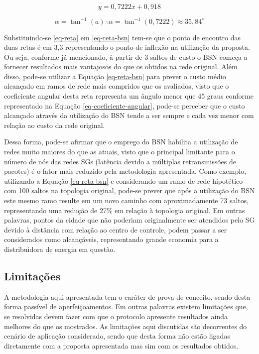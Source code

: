 \begin{equation}
y = 0,7222x + 0,918
\label{eq-reta-bsn}
\end{equation}

\begin{equation}
\alpha = \tan ^{-1}(a)\therefore \alpha =\tan ^{-1}(0,7222)\approx 35,84^{\circ}
\label{eq-coeficiente-angular}
\end{equation}

Substituindo-se \ref{eq-reta} em \ref{eq-reta-bsn} tem-se que o ponto de encontro das duas retas é em 3,3 representando o ponto de inflexão na utilização da proposta. Ou seja, conforme já mencionado, à partir de 3 saltos de custo o BSN começa a fornecer resultados mais vantajosos do que os obtidos na rede original. Além disso, pode-se utilizar a Equação \ref{eq-reta-bsn} para prever o custo médio alcançado em ramos de rede mais compridos que os avaliados, visto que o coeficiente angular desta reta representa um ângulo menor que 45 graus conforme representado na Equação \ref{eq-coeficiente-angular}, pode-se perceber que o custo alcançado através da utilização do BSN tende a ser sempre e cada vez menor com relação ao custo da rede original. 

Dessa forma, pode-se afirmar que o emprego do BSN habilita a utilização de redes muito maiores do que as atuais, visto que o principal limitante para o número de nós das redes SGs (latência devido a múltiplas retransmissões de pacotes) é o fator mais reduzido pela metodologia apresentada. Como exemplo, utilizando a Equação \ref{eq-reta-bsn} e considerando um ramo de rede hipotético com 100 saltos na topologia original, pode-se prever que após a utilização do BSN este mesmo ramo resulte em um novo caminho com aproximadamente 73 saltos, representando uma redução de 27\% em relação à topologia original. Em outras palavras, pontos da cidade que não poderiam originalmente ser atendidos pelo SG devido à distância com relação ao centro de controle, podem passar a ser considerados como alcançáveis, representando grande economia para a distribuidora de energia em questão.

\subsection{Limitações}
A metodologia aqui apresentada tem o caráter de prova de conceito, sendo desta forma passível de aperfeiçoamentos. Em outras palavras existem limitações que, se resolvidas devem fazer com que o protocolo apresente resultados ainda melhores do que os mostrados. As limitações aqui discutidas são decorrentes do cenário de aplicação considerado, sendo que desta forma não estão ligadas diretamente com a proposta apresentada mas sim com os resultados obtidos.

